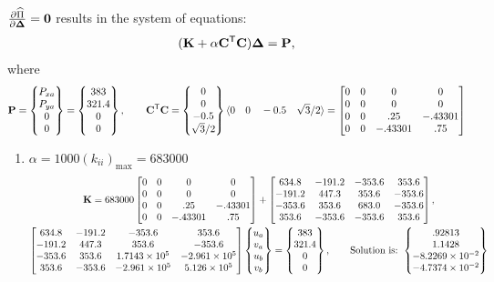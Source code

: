 \begin{example}
$\frac{\partial \widehat\Pi}{\partial \bm{\Delta}} = \mathbf{0}$ results in the system of equations:
\begin{equation*}
  (\mathbf{K} + \alpha\mathbf{C}^{\mathsf{T}}\mathbf{C})\bm{\Delta} = \mathbf{P},
\end{equation*}
where
{\small\begin{equation*}
  \mathbf{P} = \begin{Bmatrix}P_{xa}\\ P_{ya}\\ 0\\ 0\end{Bmatrix} = \begin{Bmatrix}383\\ 321.4\\ 0\\ 0\end{Bmatrix},\qquad
  \mathbf{C}^{\mathsf{T}}\mathbf{C} = \begin{Bmatrix}0\\ 0\\ -0.5\\ \sqrt3/2\end{Bmatrix}\langle 0\quad 0\quad -0.5\quad \sqrt3/2\rangle
  = \begin{bmatrix}0 & 0 & 0 & 0\\ 0 & 0 & 0 & 0\\ 0 & 0 & .25 & -.43301\\ 0 & 0 & -.43301 & .75\end{bmatrix}
\end{equation*}}
{\footnotesize
\begin{enumerate}[label=(\arabic*),leftmargin=*]
  \item $\alpha = 1000(k_{ii})_{\max} = 683000$
    \begin{gather*}
      \Kmat = 683000\bmat{0 & 0 & 0 & 0\\ 0 & 0 & 0 & 0\\ 0 & 0 & .25 & -.43301\\ 0 & 0 & -.43301 & .75} + \bmat{634.8 & -191.2 & -353.6 & 353.6\\ -191.2 & 447.3 & 353.6 & -353.6\\ -353.6 & 353.6 & 683.0 & -353.6\\ 353.6 & -353.6 & -353.6 & 353.6},\\
      \bmat{634.8 & -191.2 & -353.6 & 353.6\\ -191.2 & 447.3 & 353.6 & -353.6\\ -353.6 & 353.6 & 1.7143\times10^5 & -2.961\times10^5\\ 353.6 & -353.6 & -2.961\times10^5 & 5.126\times10^5}\Bmat{u_a\\ v_a\\ u_b\\ v_b} = \Bmat{383\\ 321.4\\ 0\\ 0},\qquad
      \text{Solution is: }\Bmat{.92813\\ 1.1428\\ -8.2269\times10^{-2}\\ -4.7374\times10^{-2}}

\end{gather*}
\end{enumerate}}
\end{example}
